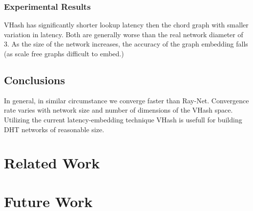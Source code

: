 \documentclass{IEEEtran}
\begin{document}
\subsubsection{Experimental Results}
VHash has significantly shorter lookup latency then the chord graph with smaller variation in latency.
Both are generally worse than the real network diameter of 3.
As the size of the network increases, the accuracy of the graph embedding falls (as scale free graphs difficult to embed.)

\subsection{Conclusions}
In general, in similar circumstance we converge faster than Ray-Net.
Convergence rate varies with network size and number of dimensions of the VHash space.
Utilizing the current latency-embedding technique VHash is usefull for building DHT networks of reasonable size.

\section{Related Work}

\section{Future Work}



\end{document}
